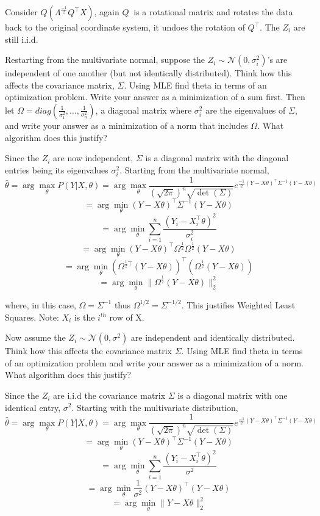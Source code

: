 \begin{Parts}
\begin{solution}
    Consider $ Q(\Lambda^{\frac{-1}{2}} Q^\top X) $, again $Q \ $ is a rotational matrix and rotates the data back to the original coordinate system, it undoes the rotation of $Q^\top$. The $Z_i$ are still i.i.d.
\end{solution}

\Part
Restarting from the multivariate normal, suppose the $Z_i \sim \mathcal N (0, \sigma_i^2)$'s are independent of one another (but not identically distributed). Think how this affects the covariance matrix, $\Sigma$. Using MLE find theta in terms of an optimization problem. Write your answer as a minimization of a sum first. Then let $\Omega = diag(\frac{1}{\sigma_1^2},\dots, \frac{1}{\sigma_n^2})$, a diagonal matrix where $\sigma^2_i$ are the eigenvalues of $\Sigma$, and write your answer as a minimization of a norm that includes $\Omega$. What algorithm does this justify?

\begin{solution}
    Since the $Z_i$ are now independent, $\Sigma$ is a diagonal matrix with the diagonal entries being its eigenvalues $\sigma^2_i$.
    Starting from the multivariate normal, 
    $$\hat \theta = \arg \max_\theta P(Y|X, \theta) = \arg \max_\theta \frac{1}{(\sqrt{2\pi})^n \sqrt{\det(\Sigma)}}  e^{\frac{-1}{2} (Y - X\theta)^\top \Sigma^{-1} (Y - X\theta)}$$
    $$ = \arg \min_\theta (Y-X\theta)^\top\Sigma^{-1}(Y-X\theta)$$
    $$ = \arg \min_\theta
    \sum_{i=1}^{n} \frac{(Y_i - X_i^\top \theta)^2}{\sigma^2_i}
    $$
    $$ = \arg \min_\theta 
    (Y-X\theta)^\top\Omega^{\frac{1}{2}}\Omega^{\frac{1}{2}}(Y-X\theta)
    $$
    $$ = \arg \min_\theta (\Omega^{\frac{1}{2}\top} (Y-X\theta))^\top(\Omega^{\frac{1}{2}} (Y-X\theta)) $$
    $$ = \arg \min_\theta \|\Omega^{\frac{1}{2}} (Y-X\theta)\|^2_2 $$

    where, in this case, $\Omega = \Sigma^{-1}$ thus $\Omega^{1/2} = \Sigma^{-1/2} $. This justifies Weighted Least Squares. Note: $X_i$ is the $i^{th}$ row of X.
\end{solution}

\Part
Now assume the $Z_i \sim \mathcal N(0, \sigma^2)$ are independent and identically distributed. Think how this affects the covariance matrix $\Sigma$. Using MLE find theta in terms of an optimization problem and write your answer as a minimization of a norm. What algorithm does this justify?

\begin{solution}
    Since the $Z_i$ are i.i.d the covariance matrix $\Sigma$ is a diagonal matrix with one identical entry, $\sigma^2$. Starting with the multivariate distribution, 
    $$\hat \theta = \arg \max_\theta P(Y|X, \theta) = \arg \max_\theta \frac{1}{(\sqrt{2\pi})^n \sqrt{\det(\Sigma)}}  e^{\frac{-1}{2} (Y - X\theta)^\top \Sigma^{-1} (Y - X\theta)}$$
    $$ = \arg \min_\theta (Y-X\theta)^\top\Sigma^{-1}(Y-X\theta)$$
    $$ = \arg \min_\theta
    \sum_{i=1}^{n} \frac{(Y_i - X_i^\top \theta)^2}{\sigma^2}
    $$
    $$ = \arg \min_\theta 
    \frac{1}{\sigma^2}(Y-X\theta)^\top(Y-X\theta)
    $$
    $$ = \arg \min_\theta \|Y-X\theta\|^2_2 $$
\end{solution}


\end{Parts}
